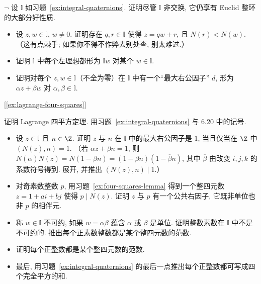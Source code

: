 \begin{prob}
\label{ex:quaternions-euclidean-like}
$\neg$ 设 $\mathbb{I}$ 如习题~\ref{ex:integral-quaternions}. 证明尽管 $\mathbb{I}$ 非交换, 它仍享有 Euclid 整环的大部分好性质.
\begin{itemize}
\item 设 $z,w\in\mathbb{I}$, $w\neq 0$. 证明存在 $q,r\in\mathbb{I}$ 使得 $z=qw+r$, 且 $N(r)<N(w)$. （这有点棘手; 如果你不得不作弊去别处查, 别太难过.）
\item 证明 $\mathbb{I}$ 中每个左理想都形为 $\mathbb{I}w$ 对某个 $w\in\mathbb{I}$.
\item 证明对每个 $z,w\in\mathbb{I}$（不全为零）在 $\mathbb{I}$ 中有一个``最大右公因子'' $d$, 形为 $\alpha z+\beta w$ 对 $\alpha,\beta\in\mathbb{I}$.
\end{itemize}
[\ref{ex:lagrange-four-squares}]
\end{prob}

\begin{prob}
\label{ex:lagrange-four-squares}
证明 Lagrange 四平方定理. 用习题~\ref{ex:integral-quaternions} 与 6.20 中的记号.
\begin{itemize}
\item 设 $z\in\mathbb{I}$ 且 $n\in\Z$. 证明 $z$ 与 $n$ 在 $\mathbb{I}$ 中的最大右公因子是 $1$, 当且仅当在 $\Z$ 中 $(N(z),n)=1$. （若 $\alpha z+\beta n=1$, 则 $N(\alpha)N(z)=N(1-\beta n)=(1-\beta n)(1-\overline{\beta}n)$, 其中 $\overline{\beta}$ 由改变 $i,j,k$ 的系数符号得到. 展开, 并推出 $(N(z),n)\mid 1$.）
\item 对奇素数整数 $p$, 用习题~\ref{ex:four-squares-lemma} 得到一个整四元数 $z=1+ai+bj$ 使得 $p\mid N(z)$. 证明 $z$ 与 $p$ 有一个公共右因子, 它既非单位也非 $p$ 的相伴元.
\item 称 $w\in\mathbb{I}$ 不可约, 如果 $w=\alpha\beta$ 蕴含 $\alpha$ 或 $\beta$ 是单位. 证明整数素数在 $\mathbb{I}$ 中不是不可约的. 推出每个正素数整数都是某个整四元数的范数.
\item 证明每个正整数都是某个整四元数的范数.
\item 最后, 用习题~\ref{ex:integral-quaternions} 的最后一点推出每个正整数都可写成四个完全平方的和.
\end{itemize}
\end{prob}
